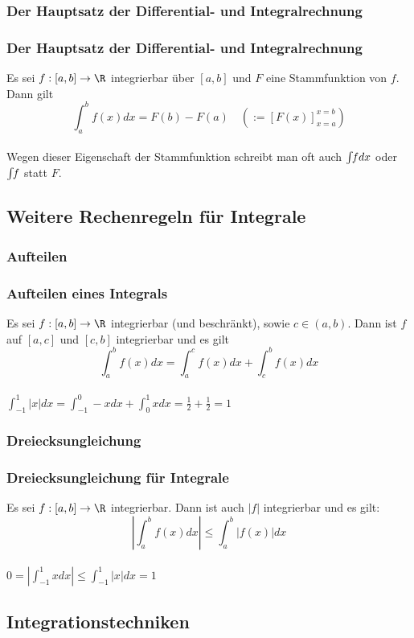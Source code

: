 \subsubsection{Der Hauptsatz der Differential- und Integralrechnung}
%
\begin{frame}\frametitle{Der Hauptsatz der Differential- und Integralrechnung}
Es sei $f:[a,b] \to \R$ integrierbar über $[a,b]$ und $F$ eine Stammfunktion von $f$. Dann gilt
$$
\int_a^b f(x) dx = F(b)-F(a) \quad \left(:= [F(x)]_{x=a}^{x=b}\right)
$$
\vfill
{}\\
Wegen dieser Eigenschaft der Stammfunktion schreibt man oft auch $\int\hspace{-1mm} fdx$ oder $\int \hspace{-1mm}f$ statt $F$.
\end{frame}
%
\subsection{Weitere Rechenregeln für Integrale}
\makeSectionDividerPage
%
\subsubsection{Aufteilen}
%
\begin{frame}\frametitle{Aufteilen eines Integrals}
Es sei $f:[a,b] \to \R$ integrierbar (und beschränkt), sowie $c \in (a,b)$. Dann ist $f$ auf $[a,c]$ und $[c,b]$ integrierbar und es gilt
$$
\int_a^b f(x)dx=\int_a^c f(x)dx + \int_c^b f(x)dx
$$
\pause\vfill
{}\\
$ \int_{-1}^1 |x|dx = \int_{-1}^0 -x dx+\int_{0}^1 xdx = \frac{1}{2} +\frac{1}{2}=1$
\end{frame}
%
\subsubsection{Dreiecksungleichung}
%
\begin{frame}\frametitle{Dreiecksungleichung für Integrale}

Es sei $f:[a,b] \to \R$ integrierbar. Dann ist auch $|f|$ integrierbar und es gilt:
$$
\left| \int_a^b f(x)dx \right| \le \int_a^b |f(x)|dx
$$
\pause\vfill
{}\\
$0=\left| \int_{-1}^1 xdx \right| \le \int_{-1}^1 |x|dx = 1$
\end{frame}
%
\subsection{Integrationstechniken}
\makeSectionDividerPage
%
